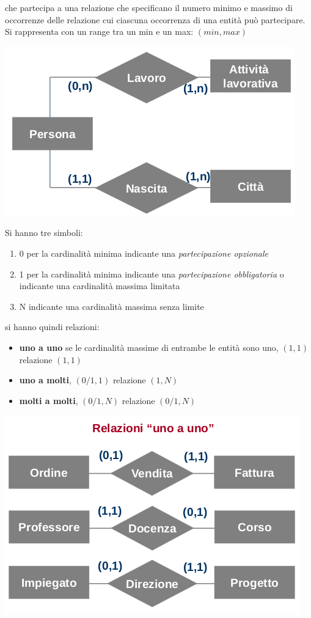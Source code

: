 \documentclass[a4paper,12pt, oneside]{book}
\begin{document}
che partecipa a una relazione che specificano il numero minimo e massimo di
occorrenze delle relazione cui ciascuna
occorrenza di una entità può partecipare. Si rappresenta con un range tra un min e un max: $(min, max)$
\begin{center}
\includegraphics[scale=0.8]{img/er4.png}
\end{center}
Si hanno tre simboli:
\begin{enumerate}
\item 0 per la cardinalità minima indicante una \textit{partecipazione opzionale}
\item 1 per la cardinalità minima indicante una \textit{partecipazione obbligatoria} o indicante una cardinalità massima limitata
\item N indicante una cardinalità massima senza limite
\end{enumerate}
si hanno quindi relazioni:
\begin{itemize}
\item \textbf{uno a uno} se le cardinalità massime di
entrambe le entità sono uno, $(1,1)$ relazione $(1,1)$
\item \textbf{uno a molti}, $(0/1,1)$ relazione $(1,N)$
\item \textbf{molti a molti}, $(0/1,N)$ relazione $(0/1,N)$
\end{itemize}
\begin{center}
\includegraphics[scale=0.6]{img/er7.png}
\end{center}
\end{document}
